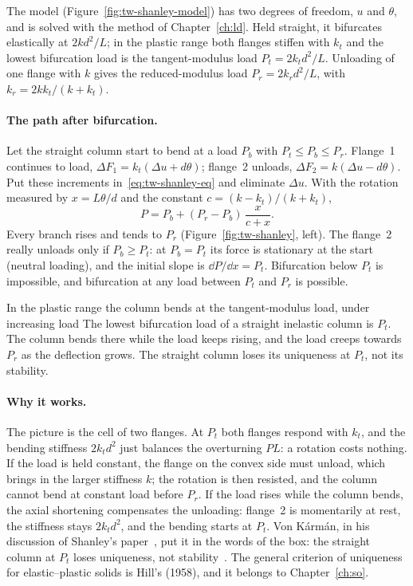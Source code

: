 The model (Figure~\ref{fig:tw-shanley-model}) has two degrees of freedom, $u$ and $\theta$, and is solved with the method of
Chapter~\ref{ch:ld}. Held straight, it bifurcates elastically at $2kd^2/L$; in the plastic range
both flanges stiffen with $k_t$ and the lowest bifurcation load is the tangent-modulus load
$P_t = 2k_td^2/L$. Unloading of one flange with $k$ gives the reduced-modulus load
$P_r = 2k_rd^2/L$, with $k_r = 2kk_t/(k + k_t)$.

\paragraph{The path after bifurcation.}
Let the straight column start to bend at a load $P_b$ with $P_t \le P_b \le P_r$. Flange~1
continues to load, $\Delta F_1 = k_t(\Delta u + d\theta)$; flange~2 unloads,
$\Delta F_2 = k(\Delta u - d\theta)$. Put these increments in~\eqref{eq:tw-shanley-eq} and
eliminate $\Delta u$. With the rotation measured by $x = L\theta/d$ and the constant
$c = (k - k_t)/(k + k_t)$,
\begin{equation}\label{eq:tw-shanley-path}
  P = P_b + (P_r - P_b)\,\frac{x}{c + x} .
\end{equation}
Every branch rises and tends to $P_r$ (Figure~\ref{fig:tw-shanley}, left). The flange~2 really
unloads only if $P_b \ge P_t$: at $P_b = P_t$ its force is stationary at the start (neutral
loading), and the initial slope is $\dd P/\dd x = P_t$. Bifurcation below $P_t$ is impossible,
and bifurcation at any load between $P_t$ and $P_r$ is possible.

\begin{gbox}{In the plastic range the column bends at the tangent-modulus load, under increasing load}\label{sec:tw-shanley-box}
%
The lowest bifurcation load of a straight inelastic column is $P_t$. The column bends there
while the load keeps rising, and the load creeps towards $P_r$ as the deflection grows. The
straight column loses its uniqueness at $P_t$, not its stability.
\end{gbox}

\paragraph{Why it works.}
The picture is the cell of two flanges. At $P_t$ both flanges respond with $k_t$, and the bending
stiffness $2k_td^2$ just balances the overturning $PL$: a rotation costs nothing. If the load is
held constant, the flange on the convex side must unload, which brings in the larger stiffness
$k$; the rotation is then resisted, and the column cannot bend at constant load before $P_r$.
If the load rises while the column bends, the axial shortening compensates the unloading:
flange~2 is momentarily at rest, the stiffness stays $2k_td^2$, and the bending starts at $P_t$.
Von Kármán, in his discussion of Shanley's paper~\cite{tw-karman1947}, put it in the words of the
box: the straight column at $P_t$ loses uniqueness, not stability~\cite[p.~68]{tw-hutchinson1974}.
The general criterion of uniqueness for elastic--plastic solids is Hill's (1958), and it belongs
to Chapter~\ref{ch:so}.

